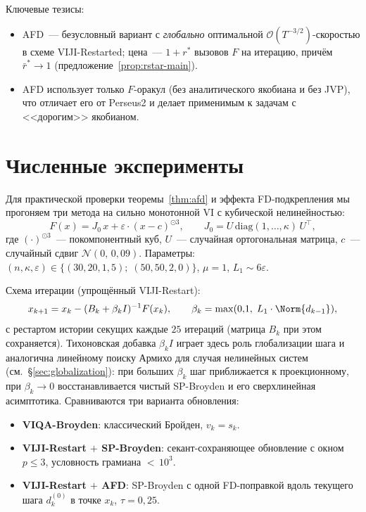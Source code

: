 Ключевые тезисы:
\begin{itemize}
\item AFD~--- безусловный вариант с \emph{глобально} оптимальной
      $\mathcal O(T^{-3/2})$-скоростью в схеме VIJI-Restarted; цена~---
      $1 + r^{*}$ вызовов $F$ на итерацию, причём $\bar r^{*} \to 1$
      (предложение~\ref{prop:rstar-main}).
\item AFD использует только $F$-оракул (без аналитического якобиана
      и без JVP), что отличает его от Perseus2 и делает применимым к
      задачам с <<дорогим>> якобианом.
\end{itemize}

\section{Численные эксперименты}
\label{sec:viji:numerics}

Для практической проверки теоремы~\ref{thm:afd} и эффекта
FD-подкрепления мы прогоняем три метода на сильно монотонной VI
с кубической нелинейностью:
\[
F(x) = J_0\,x + \varepsilon \cdot (x - c)^{\odot 3},
\qquad
J_0 = U\,\mathrm{diag}(1, \ldots, \kappa)\,U^{\top},
\]
где $(\cdot)^{\odot 3}$~--- покомпонентный куб, $U$~--- случайная
ортогональная матрица, $c$~--- случайный сдвиг $\mathcal N(0,\, 0{,}09)$.
Параметры: $(n, \kappa, \varepsilon) \in \{(30, 20, 1{,}5);\; (50, 50, 2{,}0)\}$,
$\mu = 1$, $L_1 \sim 6\varepsilon$.

Схема итерации (упрощённый VIJI-Restart):
\[
x_{k+1} = x_k - (B_k + \beta_k I)^{-1} F(x_k),
\qquad
\beta_k = \max(0{,}1,\; L_1 \cdot \Norm{d_{k-1}}),
\]
с рестартом истории секущих каждые $25$ итераций (матрица $B_k$
при этом сохраняется). Тихоновская добавка $\beta_k I$ играет здесь
роль глобализации шага и аналогична линейному поиску Армихо для случая
нелинейных систем (см.\ \S\ref{sec:globalization}): при больших
$\beta_k$ шаг приближается к проекционному, при $\beta_k\to 0$
восстанавливается чистый SP-Broyden и его сверхлинейная асимптотика.
Сравниваются три варианта обновления:

\begin{itemize}
\item \textbf{VIQA-Broyden}: классический Бройден, $v_k = s_k$.
\item \textbf{VIJI-Restart $+$ SP-Broyden}: секант-сохраняющее
      обновление с окном $p \le 3$, условность грамиана ${<}\,10^3$.
\item \textbf{VIJI-Restart $+$ AFD}: SP-Broyden с одной FD-поправкой
      вдоль текущего шага $d_k^{(0)}$ в точке $x_k$, $\tau = 0{,}25$.
\end{itemize}

